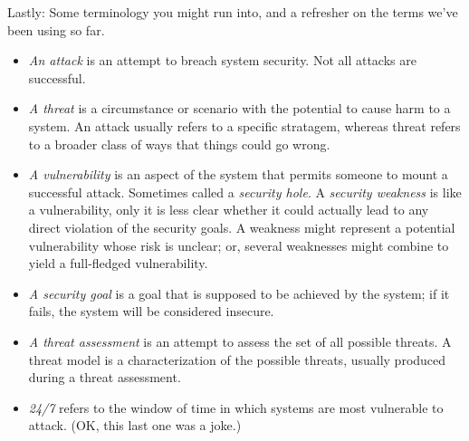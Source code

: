 \documentclass[11pt]{article}
\begin{document}
Lastly: Some terminology you might run into, and a
refresher on the terms we've been using so far. 
\begin{itemize}
\item {\em An attack} is an
attempt to breach system security. Not all attacks are
successful. 
\item {\em A threat} is a circumstance or scenario with the
potential to cause harm to a system. An attack usually refers to a
specific stratagem, whereas threat refers to a broader class of ways
that things could go wrong.
\item {\em A vulnerability} is an aspect of the
system that permits someone to mount a successful attack. Sometimes
called a {\em security hole}.  A {\em security weakness} is like a vulnerability,
only it is less clear whether it could actually lead to any direct
violation of the security goals. A weakness might represent a
potential vulnerability whose risk is unclear; or, several weaknesses
might combine to yield a full-fledged vulnerability.
\item {\em A security goal} is a goal that is supposed to be achieved by the system; if it
fails, the system will be considered insecure.
\item {\em A threat assessment} is an attempt to assess the set of all possible threats. A
threat model is a characterization of the possible threats, usually
produced during a threat assessment.
\item {\em 24/7} refers to the
window of time in which systems are most vulnerable to attack.  (OK,
this last one was a joke.)  
\end{itemize}
\end{document}
